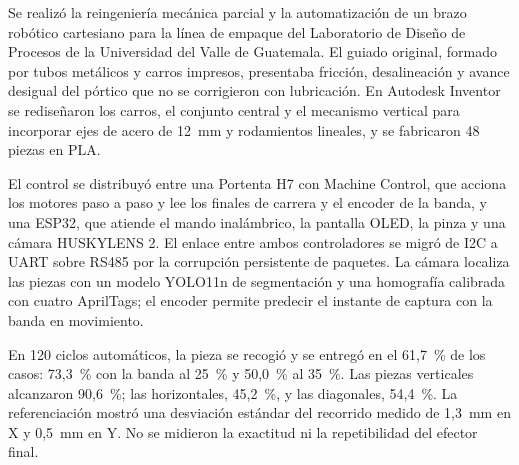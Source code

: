 Se realizó la reingeniería mecánica parcial y la automatización de un brazo robótico cartesiano para la línea de empaque del Laboratorio de Diseño de Procesos de la Universidad del Valle de Guatemala. El guiado original, formado por tubos metálicos y carros impresos, presentaba fricción, desalineación y avance desigual del pórtico que no se corrigieron con lubricación. En Autodesk Inventor se rediseñaron los carros, el conjunto central y el mecanismo vertical para incorporar ejes de acero de 12~mm y rodamientos lineales, y se fabricaron 48 piezas en PLA.

El control se distribuyó entre una Portenta H7 con Machine Control, que acciona los motores paso a paso y lee los finales de carrera y el encoder de la banda, y una ESP32, que atiende el mando inalámbrico, la pantalla OLED, la pinza y una cámara HUSKYLENS 2. El enlace entre ambos controladores se migró de I2C a UART sobre RS485 por la corrupción persistente de paquetes. La cámara localiza las piezas con un modelo YOLO11n de segmentación y una homografía calibrada con cuatro AprilTags; el encoder permite predecir el instante de captura con la banda en movimiento.

En 120 ciclos automáticos, la pieza se recogió y se entregó en el 61,7~\% de los casos: 73,3~\% con la banda al 25~\% y 50,0~\% al 35~\%. Las piezas verticales alcanzaron 90,6~\%; las horizontales, 45,2~\%, y las diagonales, 54,4~\%. La referenciación mostró una desviación estándar del recorrido medido de 1,3~mm en X y 0,5~mm en Y. No se midieron la exactitud ni la repetibilidad del efector final.
